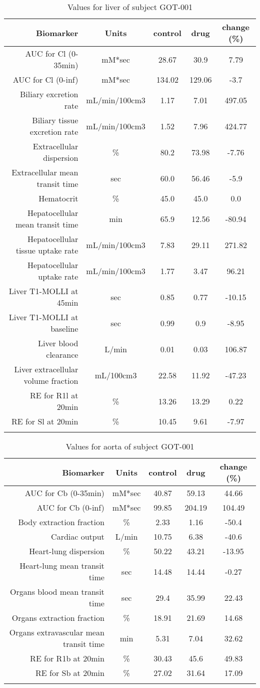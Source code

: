 \documentclass{epflreport}%
\begin{document}
%
\clearpage%
\begin{longtable}{rcccc}%
\hline%
Biomarker&Units&control&drug&change (\%)\\%
\hline%
AUC for Cl (0{-}35min)&mM*sec&28.67&30.9&7.79\\%
AUC for Cl (0{-}inf)&mM*sec&134.02&129.06&{-}3.7\\%
Biliary excretion rate&mL/min/100cm3&1.17&7.01&497.05\\%
Biliary tissue excretion rate&mL/min/100cm3&1.52&7.96&424.77\\%
Extracellular dispersion&\%&80.2&73.98&{-}7.76\\%
Extracellular mean transit time&sec&60.0&56.46&{-}5.9\\%
Hematocrit&\%&45.0&45.0&0.0\\%
Hepatocellular mean transit time&min&65.9&12.56&{-}80.94\\%
Hepatocellular tissue uptake rate&mL/min/100cm3&7.83&29.11&271.82\\%
Hepatocellular uptake rate&mL/min/100cm3&1.77&3.47&96.21\\%
Liver T1{-}MOLLI at 45min&sec&0.85&0.77&{-}10.15\\%
Liver T1{-}MOLLI at baseline&sec&0.99&0.9&{-}8.95\\%
Liver blood clearance&L/min&0.01&0.03&106.87\\%
Liver extracellular volume fraction&mL/100cm3&22.58&11.92&{-}47.23\\%
RE for R1l at 20min&\%&13.26&13.29&0.22\\%
RE for Sl at 20min&\%&10.45&9.61&{-}7.97\\%
\hline%
\caption{Values for liver of subject GOT-001} \\%
\end{longtable}%
\begin{longtable}{rcccc}%
\hline%
Biomarker&Units&control&drug&change (\%)\\%
\hline%
AUC for Cb (0{-}35min)&mM*sec&40.87&59.13&44.66\\%
AUC for Cb (0{-}inf)&mM*sec&99.85&204.19&104.49\\%
Body extraction fraction&\%&2.33&1.16&{-}50.4\\%
Cardiac output&L/min&10.75&6.38&{-}40.6\\%
Heart{-}lung dispersion&\%&50.22&43.21&{-}13.95\\%
Heart{-}lung mean transit time&sec&14.48&14.44&{-}0.27\\%
Organs blood mean transit time&sec&29.4&35.99&22.43\\%
Organs extraction fraction&\%&18.91&21.69&14.68\\%
Organs extravascular mean transit time&min&5.31&7.04&32.62\\%
RE for R1b at 20min&\%&30.43&45.6&49.83\\%
RE for Sb at 20min&\%&27.02&31.64&17.09\\%
\hline%
\caption{Values for aorta of subject GOT-001} \\%
\end{longtable}%
\clearpage%
\end{document}
